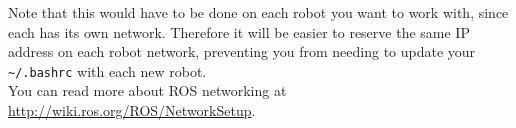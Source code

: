 Note that this would have to be done on each robot you want to work with, since each has its own network. 
Therefore it will be easier to reserve the same IP address on each robot network, preventing you from needing to update your \texttt{\textasciitilde/.bashrc} with each new robot. \\


You can read more about ROS networking at \href{http://wiki.ros.org/ROS/NetworkSetup}{http://wiki.ros.org/ROS/NetworkSetup}.
